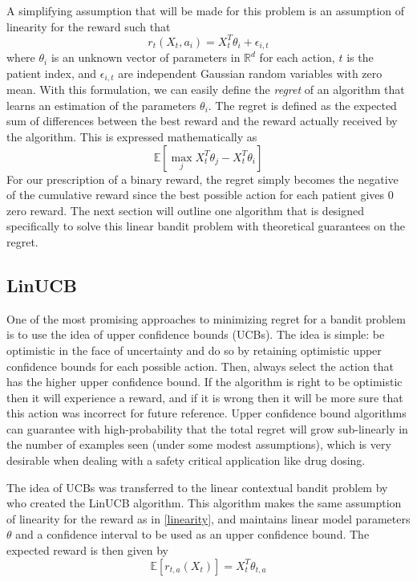 \documentclass{article}
\begin{document}
A simplifying assumption that will be made for this problem is an assumption of linearity for the reward such that 
\begin{equation}
\label{linearity}
    r_t(X_t, a_i) = X_t^T \theta_i + \epsilon_{i,t}
\end{equation}
where $\theta_i$ is an unknown vector of parameters in $\mathbb{R}^d$ for each action, $t$ is the patient index, and $\epsilon_{i,t}$ are independent Gaussian random variables with zero mean. With this formulation, we can easily define the \textit{regret} of an algorithm that learns an estimation of the parameters $\theta_i$. The regret is defined as the expected sum of differences between the best reward and the reward actually received by the algorithm. This is expressed mathematically as 
\begin{equation}
\mathbb{E}[ \max_j X_t^T \theta_j  - X_t^T \theta_i ]
\end{equation}
For our prescription of a binary reward, the regret simply becomes the negative of the cumulative reward since the best possible action for each patient gives 0 zero reward. The next section will outline one algorithm that is designed specifically to solve this linear bandit problem with theoretical guarantees on the regret.

\subsection{LinUCB}
One of the most promising approaches to minimizing regret for a bandit problem is to use the idea of upper confidence bounds (UCBs). The idea is simple: be optimistic in the face of uncertainty and do so by retaining optimistic upper confidence bounds for each possible action. Then, always select the action that has the higher upper confidence bound. If the algorithm is right to be optimistic then it will experience a reward, and if it is wrong then it will be more sure that this action was incorrect for future reference. Upper confidence bound algorithms can guarantee with high-probability that the total regret will grow sub-linearly in the number of examples seen (under some modest assumptions), which is very desirable when dealing with a safety critical application like drug dosing. 

The idea of UCBs was transferred to the linear contextual bandit problem by \cite{li2010contextual} who created the LinUCB algorithm. This algorithm makes the same assumption of linearity for the reward as in \cref{linearity}, and maintains linear model parameters $\theta$ and a confidence interval to be used as an upper confidence bound. The expected reward is then given by 
\begin{equation} \mathbb{E}[r_{t, a}(X_t)] = X_t^T \theta_{t,a} \end{equation}
\end{document}
